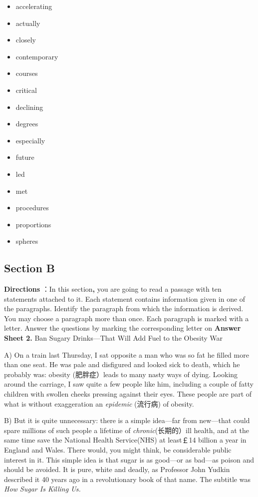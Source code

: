 \documentclass[UTF8,11pt]{ctexart}
\begin{document}
\begin{itemize}[leftmargin=2em,itemsep=.2em,topsep=.4em]\item[A.] accelerating
\item[B.] actually
\item[C.] closely
\item[D.] contemporary
\item[E.] courses
\item[F.] critical
\item[G.] declining
\item[H.] degrees
\item[I.] especially
\item[J.] future
\item[K.] led
\item[L.] met
\item[M.] procedures
\item[N.] proportions
\item[O.] spheres
\end{itemize}

\subsection*{\textbf{Section B}}


\textbf{Directions} ：In this section\textbf{,} you are going to read a passage with ten statements attached to it. Each statement contains information given in one of the paragraphs. Identify the paragraph from which the information is derived. You may choose a paragraph more than once. Each paragraph is marked with a letter. Answer the questions by marking the corresponding letter on\textbf{ Answer Sheet 2.} Ban Sugary Drinks—That Will Add Fuel to the Obesity War


A) On a train last Thursday, I sat opposite a man who was so fat he filled more than one seat. He was pale and disfigured and looked sick to death, which he probably was: obesity (肥胖症）leads to many nasty ways of dying. Looking around the carriage, I saw quite a few people like him, including a couple of fatty children with swollen cheeks pressing against their eyes. These people are part of what is without exaggeration an\textit{ epidemic} (流行病) of obesity.


B) But it is quite unnecessary: there is a simple idea—far from new—that could spare millions of such people a lifetime of \textit{chronic}(长期的）ill health, and at the same time save the National Health Service(NHS) at least￡14 billion a year in England and Wales. There would, you might think, be considerable public interest in it. This simple idea is that sugar is as good—or as bad—as poison and should be avoided. It is pure, white and deadly, as Professor John Yudkin described it 40 years ago in a revolutionary book of that name. The subtitle was\textit{ How Sugar Is Killing Us.}
\end{document}
